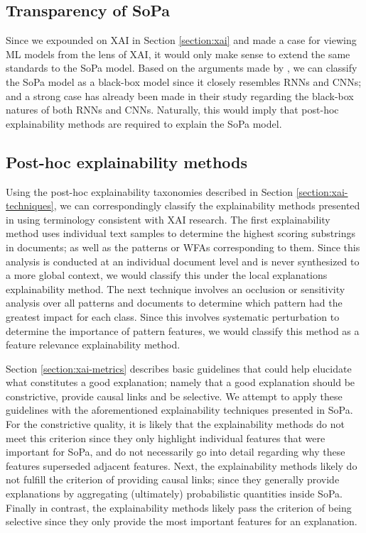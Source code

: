 \subsection{Transparency of SoPa}

\label{section:sopa-transparency}

Since we expounded on XAI in Section \ref{section:xai} and made a case for
viewing ML models from the lens of XAI, it would only make sense to extend the
same standards to the SoPa model. Based on the arguments made by
\citet{arrieta2020explainable}, we can classify the SoPa model as a black-box
model since it closely resembles RNNs and CNNs; and a strong case has already
been made in their study regarding the black-box natures of both RNNs and CNNs.
Naturally, this would imply that post-hoc explainability methods are required to
explain the SoPa model.

\subsection{Post-hoc explainability methods}

\label{section:sopa-explainability}

Using the post-hoc explainability taxonomies described in Section
\ref{section:xai-techniques}, we can correspondingly classify the explainability
methods presented in \citet{schwartz2018sopa} using terminology consistent with
XAI research. The first explainability method uses individual text samples to
determine the highest scoring substrings in documents; as well as the patterns
or WFAs corresponding to them. Since this analysis is conducted at an individual
document level and is never synthesized to a more global context, we would
classify this under the local explanations explainability method. The next
technique involves an occlusion or sensitivity analysis over all patterns and
documents to determine which pattern had the greatest impact for each class.
Since this involves systematic perturbation to determine the importance of
pattern features, we would classify this method as a feature relevance
explainability method.

Section \ref{section:xai-metrics} describes basic guidelines that could help
elucidate what constitutes a good explanation; namely that a good explanation
should be constrictive, provide causal links and be selective. We attempt to
apply these guidelines with the aforementioned explainability techniques
presented in SoPa. For the constrictive quality, it is likely that the
explainability methods do not meet this criterion since they only highlight
individual features that were important for SoPa, and do not necessarily go into
detail regarding why these features superseded adjacent features. Next, the
explainability methods likely do not fulfill the criterion of providing causal
links; since they generally provide explanations by aggregating (ultimately)
probabilistic quantities inside SoPa. Finally in contrast, the explainability
methods likely pass the criterion of being selective since they only provide the
most important features for an explanation.

